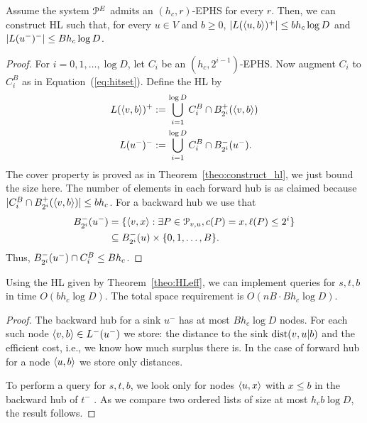 \begin{theorem}\label{theo:HLeff}
Assume the system $\mathcal{P}^E$ admits an $(h_c,r)$-EPHS for every $r$.
Then, we can construct HL such that, for every $u\in V$ and $b\geq 0$, $\lvert L(\langle u,b\rangle)^+\rvert\leq bh_c\log D$ and $\lvert L(u^-)^-\rvert\leq Bh_c\log D$. 
\end{theorem}
\begin{proof}
For $i=0,1,\ldots,\log D$, let $C_i$ be an $(h_c,2^{i-1})$-EPHS.
Now augment $C_i$ to $C_i^B$ as in Equation~(\ref{eq:hitset}).
Define the HL by
\begin{align*}
L(\langle v,b\rangle)^+ &:= \bigcup_{i=1}^{\log D} C_i^B\cap B^+_{2^i}(\langle v,b\rangle)\\
L(u^-)^-  &:= \bigcup_{i=1}^{\log D} C_i^B\cap B^-_{2^i}(u^-).
\end{align*}
The cover property is proved as in Theorem~\ref{theo:construct_hl}, we just bound the size here.
The number of elements in each forward hub is as claimed because $ \lvert C_i^B\cap B^+_{2^i}(\langle v,b\rangle)\rvert\leq bh_c$.
For a backward hub we use that
\begin{align*}
B^-_{2^i}(u^-) &= \{\langle v,x\rangle: \exists P\in \mathcal{P}_{v,u}, c(P)=x, \ell(P)\leq 2^i\}\\
&\subseteq B^-_{2^i}(u)\times \{0,1,\ldots,B\}.
\end{align*}
Thus, $B^-_{2^i}(u^-)\cap C_i^B\leq Bh_c$.
\end{proof}


\begin{proposition}
Using the HL given by Theorem~\ref{theo:HLeff}, we can implement queries for $s,t,b$ in time $O(b h_c\log D)$.
The total space requirement is $O(nB \cdot Bh_c\log D)$.
\end{proposition}
\begin{proof}
The backward hub for a sink $u^-$ has at most $Bh_c\log D$ nodes.
For each such node $\langle v,b\rangle\in L^-(u^-)$ we store: the distance to the sink $\text{dist}(v,u|b)$ and the efficient cost, i.e., we know how much surplus there is.
In the case of forward hub for a node $\langle u,b\rangle$ we store only distances.

To perform a query for $s,t,b$, we look only for nodes $\langle u,x\rangle$ with $x\leq b$ in the backward hub of $t^-$ .
As we compare two ordered lists of size at most $h_cb\log D$, the result follows.
\end{proof}
